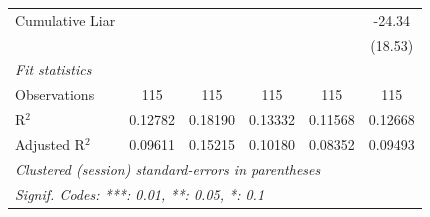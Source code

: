 \begin{tabular}{lccccc}
   Cumulative Liar  &               &               &               &               & -24.34\\   
                    &               &               &               &               & (18.53)\\   
   \midrule
   \emph{Fit statistics}\\
   Observations     & 115           & 115           & 115           & 115           & 115\\  
   R$^2$            & 0.12782       & 0.18190       & 0.13332       & 0.11568       & 0.12668\\  
   Adjusted R$^2$   & 0.09611       & 0.15215       & 0.10180       & 0.08352       & 0.09493\\  
   \midrule \midrule
   \multicolumn{6}{l}{\emph{Clustered (session) standard-errors in parentheses}}\\
   \multicolumn{6}{l}{\emph{Signif. Codes: ***: 0.01, **: 0.05, *: 0.1}}\\
\end{tabular}
\par\endgroup



